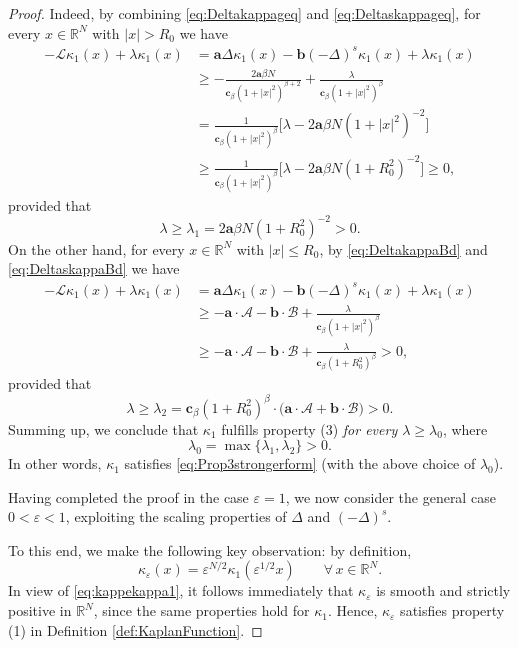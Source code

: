 \documentclass[11pt,a4paper,reqno]{amsart}
\def \R {\mathbb{R}}
\def \LL {\mathcal{L}}
\theoremstyle{definition}
\theoremstyle{plain}
\numberwithin{equation}{section}
\begin{document}
\begin{proof}
Indeed, by combining \eqref{eq:Deltakappageq} and \eqref{eq:Deltaskappageq},
for every $x\in\R^N$ with $|x| > R_0$ we have
\begin{align*}
-\LL\kappa_1(x)+\lambda\kappa_1(x) & = \mathbf{a}\Delta\kappa_1(x)-\mathbf{b}(-\Delta)^s\kappa_1(x)+\lambda\kappa_1(x) \\
& \geq -\frac{2\mathbf{a}\beta N}{\mathbf{c}_\beta(1+|x|^2)^{\beta+2}}	+\frac{\lambda}{\mathbf{c}_\beta(1+|x|^2)^\beta} \\
& = \frac{1}{\mathbf{c}_\beta(1+|x|^2)^{\beta}}\big[\lambda-2\mathbf{a}\beta N(1+|x|^2)^{-2}\big] \\
& \geq \frac{1}{\mathbf{c}_\beta(1+|x|^2)^{\beta}}\big[\lambda-2\mathbf{a}\beta N(1+R_0^2)^{-2}\big] \geq 0,
\end{align*}
provided that
$$\lambda \geq \lambda_1 = 2\mathbf{a}\beta N(1+R_0^2)^{-2}>0.$$
On the other hand, for every $x\in\R^N$ with $|x|\leq R_0$, by
\eqref{eq:DeltakappaBd} and \eqref{eq:DeltaskappaBd} we have
\begin{align*}
	-\LL\kappa_1(x)+\lambda\kappa_1(x) & = \mathbf{a}\Delta\kappa_1(x)-\mathbf{b}(-\Delta)^s\kappa_1(x)+\lambda\kappa_1(x) \\
	&\geq -\mathbf{a}\cdot\mathcal{A}-\mathbf{b}\cdot\mathcal{B}+\frac{\lambda}{\mathbf{c}_\beta(1+|x|^2)^\beta} \\
	& \geq -\mathbf{a}\cdot\mathcal{A}-\mathbf{b}\cdot\mathcal{B}+\frac{\lambda}{\mathbf{c}_\beta(1+R_0^2)^\beta}  > 0,
\end{align*}
provided that
$$\lambda\geq \lambda_2 = \mathbf{c}_\beta(1+R_0^2)^\beta\cdot\big(\mathbf{a}\cdot\mathcal{A}+\mathbf{b}\cdot\mathcal{B}\big)> 0.$$
Summing up, we conclude that $\kappa_1$ fulfills property (3)
\emph{for every $\lambda\geq \lambda_0$}, where
\begin{equation} \label{eq:deflambdazero}
\lambda_0 =  \max\{\lambda_1,\lambda_2\}> 0.	
\end{equation}
In other words, $\kappa_1$ satisfies \eqref{eq:Prop3strongerform} (with the above choice of $\lambda_0$).
\vspace{0.1cm}

Having completed the proof in the case $\varepsilon = 1$, we now consider the general case $0<\varepsilon<1$, exploiting the scaling properties of $\Delta$ and $(-\Delta)^s$.

To this end, we make the following key observation: by definition,
\begin{equation} \label{eq:kappekappa1}
\kappa_\varepsilon(x) = \varepsilon^{N/2}\kappa_1(\varepsilon^{1/2}x)
\qquad \forall\, x\in\mathbb{R}^N.
\end{equation}
In view of \eqref{eq:kappekappa1}, it follows immediately that $\kappa_\varepsilon$ is smooth and strictly positive in $\mathbb{R}^N$, since the same properties hold for $\kappa_1$. Hence, $\kappa_\varepsilon$ satisfies property (1) in Definition \ref{def:KaplanFunction}.


\end{proof}
\end{document}

